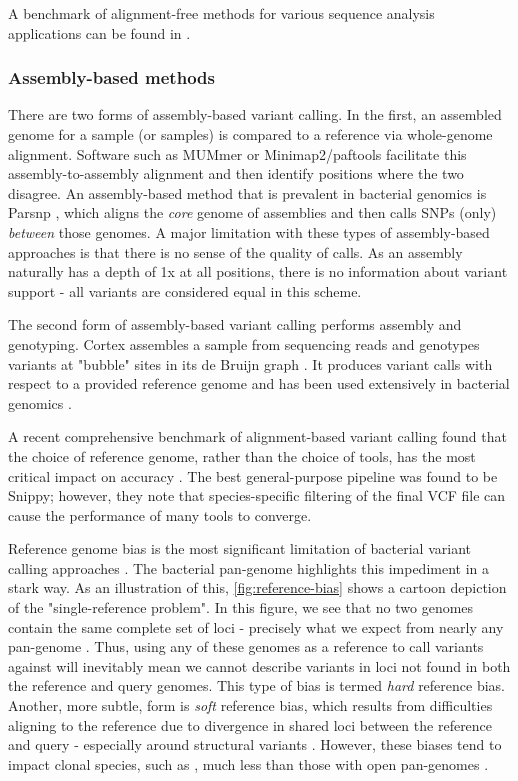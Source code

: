 A benchmark of alignment-free methods for various sequence analysis applications can be found in \cite{Zielezinski2019}. 

\subsubsection{Assembly-based methods}
\label{sec:asm-var-call}
There are two forms of assembly-based variant calling. In the first, an assembled genome for a sample (or samples) is compared to a reference via whole-genome alignment. Software such as MUMmer \cite{mummer2018} or Minimap2/paftools \cite{li2018} facilitate this assembly-to-assembly alignment and then identify positions where the two disagree. An assembly-based method that is prevalent in bacterial genomics is Parsnp \cite{Treangen2014}, which aligns the \emph{core} genome of assemblies and then calls SNPs (only) \emph{between} those genomes. A major limitation with these types of assembly-based approaches is that there is no sense of the quality of calls. As an assembly naturally has a depth of 1x at all positions, there is no information about variant support - all variants are considered equal in this scheme.

The second form of assembly-based variant calling performs assembly and genotyping. Cortex \denovo{} assembles a sample from sequencing reads and genotypes variants at "bubble" sites in its de Bruijn graph \cite{iqbal2012}. It produces variant calls with respect to a provided reference genome and has been used extensively in bacterial genomics \cite{bradley2015,hunt2019,Stasiewicz2015,Young2017,Lees2017}.

\hspace{0.75cm}

\noindent
A recent comprehensive benchmark of alignment-based variant calling found that the choice of reference genome, rather than the choice of tools, has the most critical impact on accuracy \cite{Bush2020}. The best general-purpose pipeline was found to be Snippy; however, they note that species-specific filtering of the final VCF file can cause the performance of many tools to converge.

Reference genome bias is the most significant limitation of bacterial variant calling approaches \cite{Bertels2014,Bush2020,Olson2015}. The bacterial pan-genome highlights this impediment in a stark way. As an illustration of this, \autoref{fig:reference-bias} shows a cartoon depiction of the "single-reference problem". In this figure, we see that no two genomes contain the same complete set of loci - precisely what we expect from nearly any pan-genome \cite{McInerney2017}. Thus, using any of these genomes as a reference to call variants against will inevitably mean we cannot describe variants in loci not found in both the reference and query genomes. This type of bias is termed \emph{hard} reference bias. Another, more subtle, form is \emph{soft} reference bias, which results from difficulties aligning to the reference due to divergence in shared loci between the reference and query - especially around structural variants \cite{Price2017,Olson2015,Pightling2014}. However, these biases tend to impact clonal species, such as \mtb{}, much less than those with open pan-genomes \cite{Bush2020}.

